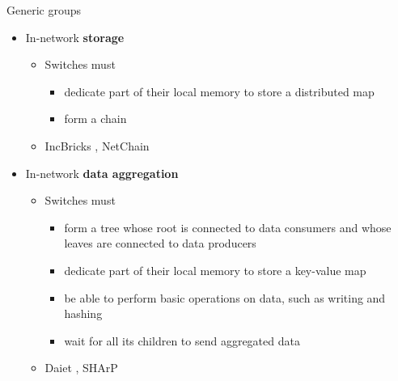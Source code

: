\begin{frame}{Generic groups}
    \begin{itemize}
        \item In-network \textbf{storage}
        \begin{itemize}
        \item Switches must
        \begin{itemize}
            \item dedicate part of their local memory to store a distributed map
            \item form a chain
        \end{itemize}
        \item IncBricks \cite{incbricks}, NetChain \cite{netchain}
        \end{itemize}
            \item In-network \textbf{data aggregation}
        \begin{itemize}
        \item Switches must
        \begin{itemize}
            \item form a tree whose root is connected to data consumers and whose leaves are connected to data producers
            \item dedicate part of their local memory to store a key-value map
            \item be able to perform basic operations on data, such as writing and hashing
            \item wait for all its children to send aggregated data
        \end{itemize}
        \item Daiet \cite{daiet}, SHArP \cite{sharp}
        \end{itemize}
    \end{itemize}
\end{frame}


